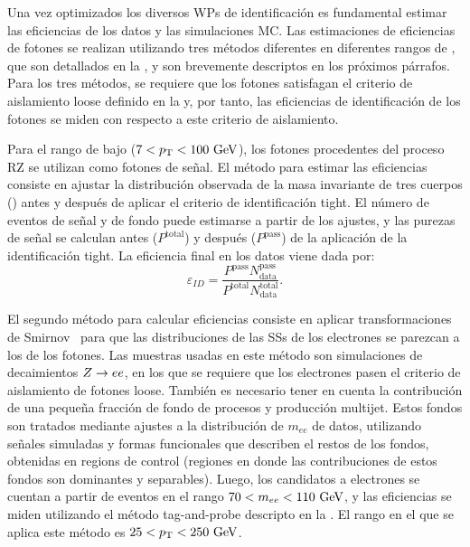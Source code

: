 Una vez optimizados los diversos \acp{WP} de identificaci\'on es fundamental estimar las eficiencias de los datos y las simulaciones \ac{MC}. Las estimaciones de eficiencias de fotones se realizan utilizando tres m\'etodos diferentes en diferentes rangos de \pt, que son detallados en la , y son brevemente descriptos en los pr\'oximos p\'arrafos.
Para los tres m\'etodos, se requiere que los fotones satisfagan el criterio de aislamiento loose definido en la \Sect{\ref{subsec:objects:egamma:iso}} y, por tanto, las eficiencias de identificaci\'on de los fotones se miden con respecto a este criterio de aislamiento. 

Para el rango de bajo \pt (\(7<p_{\text{T}}<100~\text{GeV}\)), los fotones procedentes del proceso \ac{RZ} se utilizan como fotones de señal. El m\'etodo para estimar las eficiencias consiste en ajustar la distribución observada de la masa invariante de tres cuerpos (\mlly) antes y después de aplicar el criterio de identificaci\'on tight. El número de eventos de señal y de fondo puede estimarse a partir de los ajustes, y las purezas de señal se calculan antes (\(P^{\text{total}}\)) y despu\'es (\(P^{\text{pass}}\)) de la aplicaci\'on de la identificaci\'on tight.
La eficiencia final en los datos viene dada por:
\begin{equation*}
    \varepsilon_{ID} = \frac{ P^{\text{pass}} N_{\text{data}}^{\text{pass}} }{ P^{\text{total}} N_{\text{data}}^{\text{total}} }.
\end{equation*}

El segundo método para calcular eficiencias consiste en aplicar transformaciones de Smirnov~\cite{SmirnovTransform} para que las distribuciones de las \acp{SS} de los electrones se parezcan a los de los fotones. Las muestras usadas en este m\'etodo son simulaciones de decaimientos \(Z\rightarrow ee\), en los que se requiere que los electrones pasen el criterio de aislamiento de fotones loose. Tambi\'en es necesario tener en cuenta la contribuci\'on de una peque\~na fracci\'on de fondo de procesos \Wjets y producción multijet. Estos fondos son tratados mediante ajustes a la distribuci\'on de \(m_{ee}\) de datos, utilizando señales simuladas y formas funcionales que describen el restos de los fondos, obtenidas en regions de control (regiones en donde las contribuciones de estos fondos son dominantes y separables). Luego, los candidatos a electrones se cuentan a partir de eventos en el rango \(70 < m_{ee} < 110~\text{GeV}\), y las eficiencias se miden utilizando el método tag-and-probe descripto en la . El rango \pt en el que se aplica este método es \(25<p_{\text{T}}<250~\text{GeV}\).


